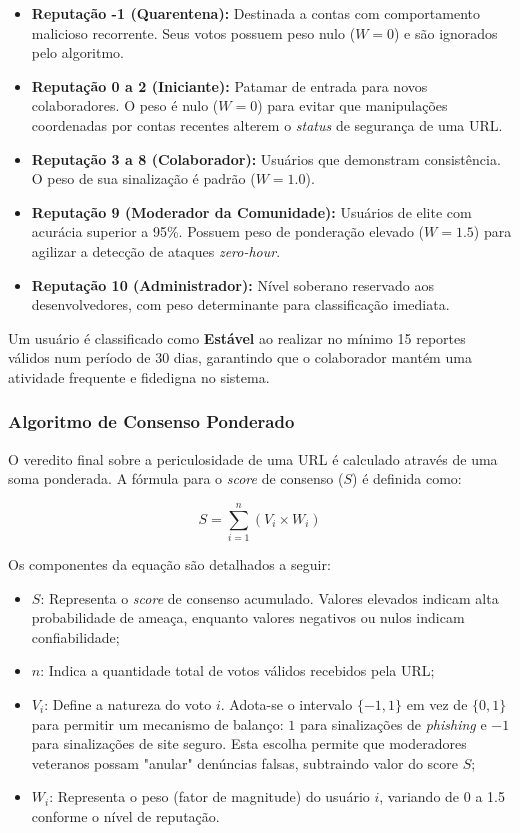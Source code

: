 \documentclass[a4paper,12pt]{article}
\begin{document}
\begin{itemize}
    \item \textbf{Reputação -1 (Quarentena):} Destinada a contas com comportamento malicioso recorrente. Seus votos possuem peso nulo ($W=0$) e são ignorados pelo algoritmo.
    \item \textbf{Reputação 0 a 2 (Iniciante):} Patamar de entrada para novos colaboradores. O peso é nulo ($W=0$) para evitar que manipulações coordenadas por contas recentes alterem o \textit{status} de segurança de uma URL.
    \item \textbf{Reputação 3 a 8 (Colaborador):} Usuários que demonstram consistência. O peso de sua sinalização é padrão ($W=1.0$).
    \item \textbf{Reputação 9 (Moderador da Comunidade):} Usuários de elite com acurácia superior a 95\%. Possuem peso de ponderação elevado ($W=1.5$) para agilizar a detecção de ataques \textit{zero-hour}.
    \item \textbf{Reputação 10 (Administrador):} Nível soberano reservado aos desenvolvedores, com peso determinante para classificação imediata.
\end{itemize}

Um usuário é classificado como \textbf{Estável} ao realizar no mínimo 15 reportes válidos num período de 30 dias, garantindo que o colaborador mantém uma atividade frequente e fidedigna no sistema.

\subsubsection{Algoritmo de Consenso Ponderado}

O veredito final sobre a periculosidade de uma URL é calculado através de uma soma ponderada. A fórmula para o \textit{score} de consenso ($S$) é definida como:

\begin{equation}
S = \sum_{i=1}^{n} (V_i \times W_i)
\end{equation}

Os componentes da equação são detalhados a seguir:
\begin{itemize}
    \item $S$: Representa o \textit{score} de consenso acumulado. Valores elevados indicam alta probabilidade de ameaça, enquanto valores negativos ou nulos indicam confiabilidade;
    \item $n$: Indica a quantidade total de votos válidos recebidos pela URL;
    \item $V_i$: Define a natureza do voto $i$. Adota-se o intervalo $\{-1, 1\}$ em vez de $\{0, 1\}$ para permitir um mecanismo de balanço: $1$ para sinalizações de \textit{phishing} e $-1$ para sinalizações de site seguro. Esta escolha permite que moderadores veteranos possam "anular" denúncias falsas, subtraindo valor do score $S$;
    \item $W_i$: Representa o peso (fator de magnitude) do usuário $i$, variando de 0 a 1.5 conforme o nível de reputação.
\end{itemize}
\end{document}
